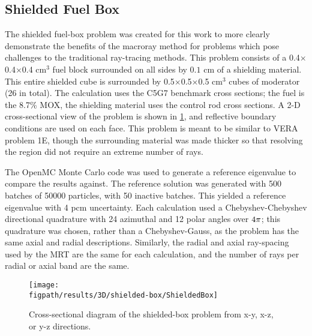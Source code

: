 {{    \subsection{Shielded Fuel Box}{\label{ssec:MR:Shielded Fuel Box}
      The shielded fuel-box problem was created for this work to more clearly demonstrate the benefits of the macroray method for problems which pose challenges to the traditional ray-tracing methods.
      This problem consists of a 0.4$\times$0.4$\times$0.4 cm$^3$ fuel block surrounded on all sides by $0.1$ cm of a shielding material.
      This entire shielded cube is surrounded by 0.5$\times$0.5$\times$0.5 cm$^3$ cubes of moderator (26 in total).
      The calculation uses the C5G7 benchmark cross sections; the fuel is the 8.7\% \ac{MOX}, the shielding material uses the control rod cross sections.
      A 2-D cross-sectional view of the problem is shown in \cref{fig:MR:Shielded-Box Diagram}, and reflective boundary conditions are used on each face.
      This problem is meant to be similar to \ac{VERA} problem 1E, though the surrounding material was made thicker so that resolving the region did not require an extreme number of rays.

      The OpenMC Monte Carlo code \cite{OpenMC} was used to generate a reference eigenvalue to compare the results against.
      The reference solution was generated with 500 batches of 50000 particles, with 50 inactive batches.
      This yielded a reference eigenvalue with 4 pcm uncertainty.
      Each calculation used a Chebyshev-Chebyshev directional quadrature with 24 azimuthal and 12 polar angles over $4\pi$;
        this quadrature was chosen, rather than a Chebyshev-Gauss, as the problem has the same axial and radial descriptions.
      Similarly, the radial and axial ray-spacing used by the \ac{MRT} are the same for each calculation, and the number of rays per radial or axial band are the same.

      \begin{figure}[h]
        \centering
        \texttt{[image: \\figpath/results/3D/shielded-box/ShieldedBox]}
        \caption{Cross-sectional diagram of the shielded-box problem from x-y, x-z, or y-z directions. \label{fig:MR:Shielded-Box Diagram}}
      \end{figure}

}}}
